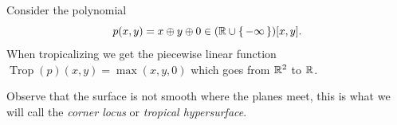 \documentclass[12pt]{memoir}
\DeclareMathOperator{\Trop}{Trop}
\begin{document}
\begin{Ex}
    Consider the polynomial 
    $$p(x,y)=x\oplus y\oplus 0\in (\mathbb{R}\cup\{\,-\infty\,\})[x,y].$$
    When tropicalizing we get the piecewise linear function $\Trop(p)(x,y)=\max(x,y,0)$ which goes from $\mathbb{R}^2$ to $\mathbb{R}$.
    \begin{figure}[h!]
        \centering
        \quad
        \quad
        \label{fig:2.1-and-2.2-and-2.3}
    \end{figure}
    Observe that the surface is not smooth where the planes meet, this is what we will call the \emph{corner locus} or \emph{tropical hypersurface}.
\end{Ex}
\end{document}
